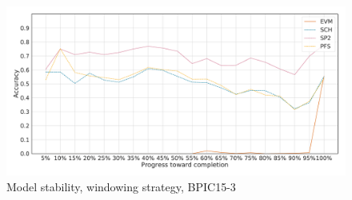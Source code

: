 \begin{figure}[!htb]
    \centering
    \includegraphics[width=\textwidth]{gfx/bpic2015_3/windowed_stability.pdf}
    \caption{Model stability, windowing strategy, BPIC15-3}
    \label{fig:bpic15-3-windowed-stability}
\end{figure}

\FloatBarrier
